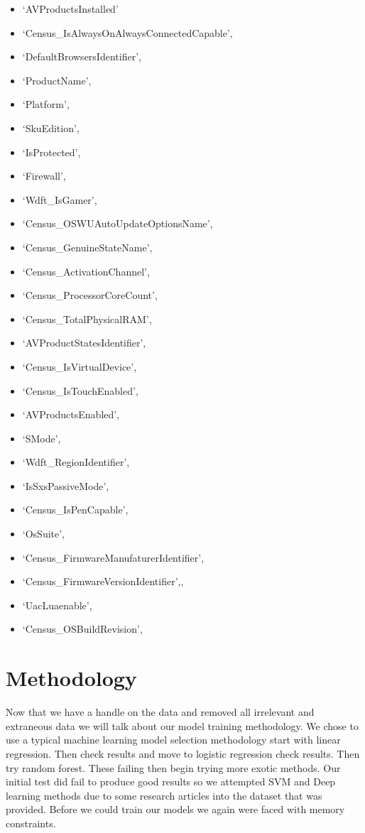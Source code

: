 \documentclass[sigconf]{acmart}
\begin{document}
\begin{itemize}
\item `AVProductsInstalled' 
\item `Census\_IsAlwaysOnAlwaysConnectedCapable',
\item `DefaultBrowsersIdentifier',
\item `ProductName',
\item `Platform',
\item `SkuEdition',
\item `IsProtected',
\item `Firewall',
\item `Wdft\_IsGamer',
\item `Census\_OSWUAutoUpdateOptionsName',
\item `Census\_GenuineStateName',
\item `Census\_ActivationChannel',
\item `Census\_ProcessorCoreCount',                               
\item `Census\_TotalPhysicalRAM',                             
\item `AVProductStatesIdentifier',
\item `Census\_IsVirtualDevice',
\item `Census\_IsTouchEnabled',
\item `AVProductsEnabled',
\item `SMode',
\item `Wdft\_RegionIdentifier',
\item `IsSxsPassiveMode',
\item `Census\_IsPenCapable',
\item `OsSuite',
\item `Census\_FirmwareManufaturerIdentifier',
\item `Census\_FirmwareVersionIdentifier',,
\item `UacLuaenable',
\item `Census\_OSBuildRevision',
\end{itemize}

\section{Methodology}
Now that we have a handle on the data and removed all irrelevant and extraneous data we will talk about our model training methodology.  We chose to use a typical machine learning model selection methodology start with linear regression. Then check results and move to logistic regression check results. Then try random forest. These failing then begin trying more exotic methods. Our initial test did fail to produce good results so we attempted SVM and Deep learning methods due to some research articles into the dataset that was provided. Before we could train our models we again were faced with memory constraints.
\end{document}
